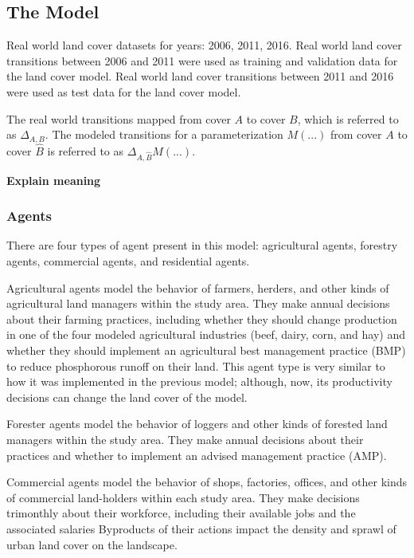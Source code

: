\subsection{The Model}
\label{subsec:land_exp_model}

Real world land cover datasets for years: 2006, 2011, 2016.
Real world land cover transitions between 2006 and 2011 were
used as training and validation data for the land cover model.
Real world land cover transitions between 2011 and 2016 were
used as test data for the land cover model.

The real world transitions mapped from cover $A$ to cover $B$,
which is referred to as $\Delta_{A,B}$.
The modeled transitions for a parameterization $M(...)$ from cover $A$
to cover $\hat{B}$ is referred to as $\Delta_{A,\hat{B}}M(...)$.

\textbf{Explain meaning}

\subsubsection{Agents}
\label{subsubsec:land_exp_agents}

There are four types of agent present in this model:
agricultural agents,
forestry agents,
commercial agents, and
residential agents.

Agricultural agents model the behavior of farmers, herders, and other kinds of 
agricultural land managers within the study area.
They make annual decisions about their farming practices,
including whether they should change production in one of the four modeled 
agricultural industries (beef, dairy, corn, and hay) 
and whether they should implement an agricultural best management practice 
(BMP) to reduce phosphorous runoff on their land.
This agent type is very similar to how it was implemented in the
previous model; although, now, its productivity decisions can change
the land cover of the model.

Forester agents model the behavior of loggers and other kinds of
forested land managers within the study area.
They make annual decisions about their practices
and whether to implement an advised management practice (AMP).

Commercial agents model the behavior of shops, factories, offices, 
and other kinds of commercial land-holders within each study area. 
They make decisions trimonthly about their workforce, 
including their available jobs and the associated salaries
Byproducts of their actions impact the density and sprawl of urban
land cover on the landscape.


